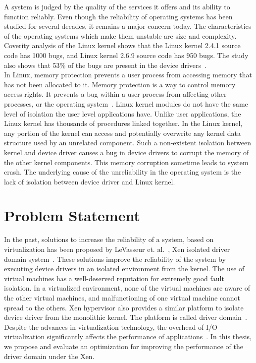 A system is judged by the quality of the services it offers and its ability to function reliably. Even though the reliability of operating systems has been studied for several decades, it remains a major concern today. The characteristics of the operating systems which make them unstable are size and complexity. 
\\[3mm]
Coverity analysis of the Linux kernel shows that the Linux kernel 2.4.1 source code has 1000 bugs, and Linux kernel 2.6.9 source code has 950 bugs. The study also shows that 53\% of the bugs are present in the device drivers~\cite{coveritykernel}. 
\\[3mm]
In Linux, memory protection prevents a user process from accessing memory that has not been allocated to it. Memory protection is a way to control memory access rights. It prevents a bug within a user process from affecting other processes, or the operating system~\cite{Denning:1970:VM:356571.356573, Galvin}. Linux kernel modules do not have the same level of isolation the user level applications have. Unlike user applications, the Linux kernel has thousands of procedures linked together. In the Linux kernel, any portion of the kernel can access and potentially overwrite any kernel data structure used by an unrelated component. Such a non-existent isolation between kernel and device driver causes a bug in device drivers to corrupt the memory of the other kernel components. This memory corruption sometime leads to system crash. The underlying cause of the unreliability in the operating system is the lack of isolation between device driver and Linux kernel.

\pagebreak

\section {Problem Statement}
\label{sec:problem}
In the past, solutions to increase the reliability of a system, based on virtualization has been proposed by LeVasseur et. al.~\cite{LeVasseur04UnmodifiedDriverReuse}, Xen isolated driver domain system~\cite{Fraser04safehardware}. These solutions improve the reliability of the system by executing device drivers in an isolated environment from the kernel. The use of virtual machines has a well-deserved reputation for extremely good fault isolation. In a virtualized environment, none of the virtual machines are aware of the other virtual machines, and malfunctioning of one virtual machine cannot spread to the others. Xen hypervisor also provides a similar platform to isolate device driver from the monolithic kernel. The platform is called driver domain~\cite{driverdomain}.
\\[3mm]
Despite the advances in virtualization technology, the overhead of I/O virtualization significantly affects the performance of applications~\cite{Barham:2003:XAV:945445.945462, Sugerman:2001:VID:647055.715774, Menon:2006:ONV:1267359.1267361}. In this thesis, we propose and evaluate an optimization for improving the performance of the driver domain under the Xen. 
\pagebreak
  
